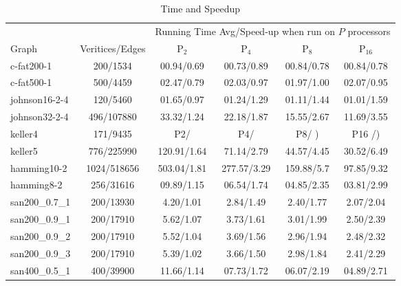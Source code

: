 \documentclass[11pt]{article}
\begin{document}
\linespread{1}
\begin{table*}[ht!]
\caption{Time and Speedup\label{tab:spar_su_par_table}}
\begin{footnotesize}
\begin{center}
\begin{tabular}{|l||c||c|c|c|c|}
\hline
&              & \multicolumn{4}{|c|}{Running Time Avg/Speed-up when run on $P$ processors}\\
\cline{3-6}
Graph&Veritices/Edges& 	P$_2$           &P$_4$            &P$_8$            &P$_{16}$   \\
\hline										              			          
c-fat200-1 	    &200/1534 		     &00.94/0.69 &00.73/0.89 &00.84/0.78 &00.84/0.78\\
c-fat500-1 	    &500/4459 		     &02.47/0.79 &02.03/0.97 &01.97/1.00 &02.07/0.95\\
\hline                                                                                   
johnson16-2-4 	&120/5460 		 &01.65/0.97 &01.24/1.29 &01.11/1.44 &01.01/1.59\\
johnson32-2-4 	&496/107880 	 &33.32/1.24 &22.18/1.87 &15.55/2.67 &11.69/3.55\\
\hline                                                                                   
keller4      	&171/9435 			 &P2/     &P4/     &P8/   ) &P16  /)\\  
keller5 	    &776/225990 		 &120.91/1.64 &71.14/2.79 &44.57/4.45 &30.52/6.49\\
\hline                                                                                   
hamming10-2 	&1024/518656 	 &503.04/1.81 &277.57/3.29 &159.88/5.7  &97.85/9.32\\
hamming8-2 	    &256/31616 	     &09.89/1.15 &06.54/1.74 &04.85/2.35 &03.81/2.99\\
\hline                                                                                   
san200\_0.7\_1 	&200/13930 	     &4.20/1.01 &2.84/1.49 &2.40/1.77 &2.07/2.04\\
san200\_0.9\_1 	&200/17910 	     &5.62/1.07 &3.73/1.61 &3.01/1.99 &2.50/2.39\\
san200\_0.9\_2 	&200/17910 	     &5.52/1.04 &3.69/1.56 &2.96/1.94 &2.48/2.32\\
san200\_0.9\_3 	&200/17910 	     &5.39/1.02 &3.66/1.50 &2.98/1.84 &2.41/2.29\\
san400\_0.5\_1 	&400/39900 	     &11.66/1.14 &07.73/1.72 &06.07/2.19 &04.89/2.71\\

\end{tabular}
\end{center}
\end{footnotesize}
\end{table*}
\end{document}
